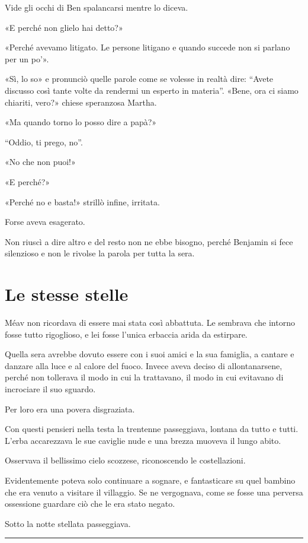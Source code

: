 \documentclass[a4paper,11pt,oneside,openright,final]{memoir}
\begin{document}
Vide gli occhi di Ben spalancarsi mentre lo diceva.

«E perché non glielo hai detto?»

«Perché avevamo litigato. Le persone litigano e quando succede non si parlano
per un po'».

«Sì, lo so» e pronunciò quelle parole come se volesse in realtà dire:
``Avete discusso così tante volte da rendermi un esperto in materia''.
«Bene, ora ci siamo chiariti, vero?» chiese speranzosa Martha.

«Ma quando torno lo posso dire a papà?»

``Oddio, ti prego, no''.

«No che non puoi!»

«E perché?»

«Perché no e basta!» strillò infine, irritata.

Forse aveva esagerato.

Non riuscì a dire altro e del resto non ne ebbe bisogno, perché Benjamin si
fece silenzioso e non le rivolse la parola per tutta la sera.

\chapter{Le stesse stelle}

Méav non ricordava di essere mai stata così abbattuta. Le sembrava che intorno
fosse tutto rigoglioso, e lei fosse l'unica erbaccia arida da estirpare.

Quella sera avrebbe dovuto essere con i suoi amici e la sua famiglia, a cantare
e danzare alla luce e al calore del fuoco. Invece aveva deciso di
allontanarsene, perché non tollerava il modo in cui la trattavano, il modo in
cui evitavano di incrociare il suo sguardo.

Per loro era una povera disgraziata.

Con questi pensieri nella testa la trentenne passeggiava, lontana da tutto e
tutti. L'erba accarezzava le sue caviglie nude e una brezza muoveva il lungo
abito.

Osservava il bellissimo cielo scozzese, riconoscendo le costellazioni.

Evidentemente poteva solo continuare a sognare, e fantasticare su quel bambino
che era venuto a visitare il villaggio. Se ne vergognava, come se fosse una
perversa ossessione guardare ciò che le era stato negato.

Sotto la notte stellata passeggiava.

\plainbreak{1}
\end{document}
